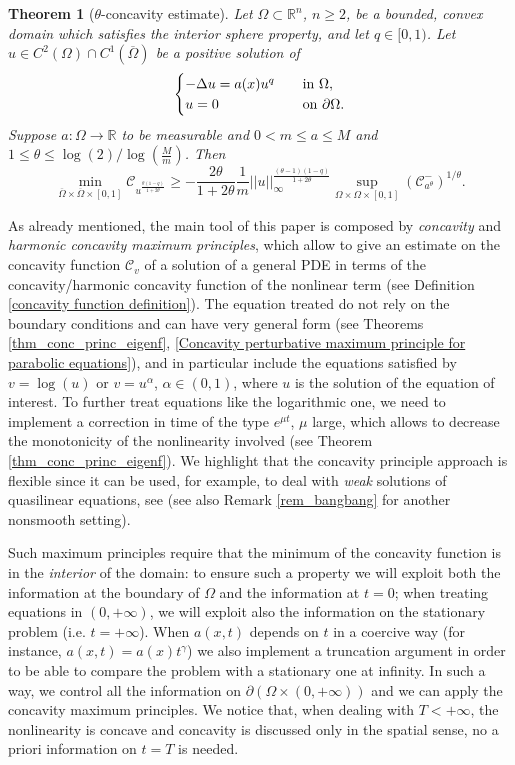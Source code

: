 \documentclass[11pt, reqno]{amsart}
\newtheorem{theorem}[lemma]{Theorem}
\theoremstyle{definition}
\numberwithin{equation}{section}
\newcommand{\Omegabar}{\overline{\Omega}}
\newcommand{\R}{\mathbb{R}}
\newcommand{\mc}[1]{\mathcal{#1}}
\begin{document}
\begin{theorem}[$\theta$-concavity estimate]	
Let $\Omega \subset \R^n$, $n\geq 2$, be a bounded, convex domain which satisfies the interior sphere property, and let $q \in [0,1)$. Let $u\in C^2(\Omega)\cap C^1(\Omegabar)$ be a positive solution of
$$\begin{cases}
-\Delta u = a(x) u^q & \quad \hbox{in $\Omega$}, \\
u=0 & \quad \hbox{on $\partial \Omega$}.
\end{cases}
$$
Suppose $a\colon \Omega \to \R$ to be measurable and $0<m\leq a \leq M$ and $1\leq\theta \leq\log(2)/\log(\frac{M}{m})$. 
 Then
\[	\min_{\Omegabar\times \Omegabar\times[0,1]}\mathcal{C}_{u^{\frac{\theta(1-q)}{1+2\theta}}}
\geq
-\frac{2\theta}{1+2\theta} \frac{1}{m}||u||_\infty^{\frac{(\theta-1)(1-q)}{1+2\theta}}
\sup\limits_{\Omega \times \Omega\times[0,1]}
(\mathcal{C}^-_{a^{\theta}})^{1/\theta}.\]
\end{theorem}

As already mentioned, the main tool of this paper is composed by \emph{concavity} and \emph{harmonic concavity maximum principles}, which allow to give an estimate on the concavity function $\mc{C}_v$ of a solution of a general PDE in terms of the concavity/harmonic concavity function of the nonlinear term (see Definition \ref{concavity function definition}). 
The equation treated do not rely on the boundary conditions and can have very general form (see Theorems \ref{thm_conc_princ_eigenf}, \ref{Concavity perturbative maximum principle for parabolic equations}), and in particular include the equations satisfied by $v=\log(u)$ or $v=u^{\alpha}$, $\alpha \in (0,1)$, where $u$ is the solution of the equation of interest.
To further treat equations like the logarithmic one, we need to implement a correction in time of the type $e^{\mu t}$, $\mu$ large, which allows to decrease the monotonicity of the nonlinearity involved (see Theorem \ref{thm_conc_princ_eigenf}).
We highlight that the concavity principle approach is flexible since it can be used, for example, to deal with \emph{weak} solutions of quasilinear equations, see \cite{GaSq24, BMSplaplacian, Lin1994} (see also Remark \ref{rem_bangbang} for another nonsmooth setting).

Such maximum principles require that the minimum of the concavity function is in the \emph{interior} of the domain: to ensure such a property we will exploit both the information at the boundary of $\Omega$ and the information at $t=0$; when treating equations in $(0,+\infty)$, we will exploit also the information on the stationary problem (i.e. $t=+\infty$). 
When $a(x,t)$ depends on $t$ in a coercive way (for instance, $a(x,t)=a(x) t^{\gamma}$) we also implement a truncation argument in order to be able to compare the problem with a stationary one at infinity.
In such a way, we control all the information on $\partial(\Omega \times (0,+\infty))$ and we can apply the concavity maximum principles. 
We notice that, when dealing with $T<+\infty$, the nonlinearity is concave and concavity is discussed only in the spatial sense, no a priori information on $t=T$ is needed.
\end{document}
